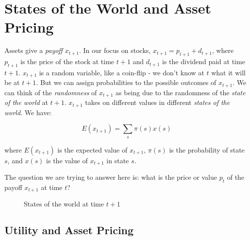 \chapter{States of the World and Asset Pricing}

Assets give a \textit{payoff} $x_{t+1}$. In our focus on stocks, 
$x_{t+1} = p_{t+1} + d_{t+1}$, where $p_{t+1}$ is the 
price of the stock at time $t+1$ and $d_{t+1}$ 
is the dividend paid at time $t+1$.
$x_{t+1}$ is a random variable, like a coin-flip - we don't 
know at $t$ what it will be at $t+1$. But we can assign 
probabilities to the possible outcomes of $x_{t+1}$.
We can think of the \textit{randomness} of $x_{t+1}$ as being
due to the randomness of the \textit{state of the world} at $t+1$.
$x_{t+1}$ takes on different values in 
different \textit{states of the world}.
We have:

\begin{equation}
    E(x_{t+1}) = \sum_s \pi(s) x(s)
\end{equation}

where $E(x_{t+1})$ is the expected value of $x_{t+1}$,
$\pi(s)$ is the probability of state $s$, and $x(s)$ is the
value of $x_{t+1}$ in state $s$.

The question we are trying to answer here is: what is the price 
or value $p_t$ of the payoff $x_{t+1}$ at time $t$?

\begin{figure}[htbp]
    \centering
{}
    \caption{States of the world at time \(t+1\)}
    \label{fig:states_of_the_world}
\end{figure}

\section{Utility and Asset Pricing}

